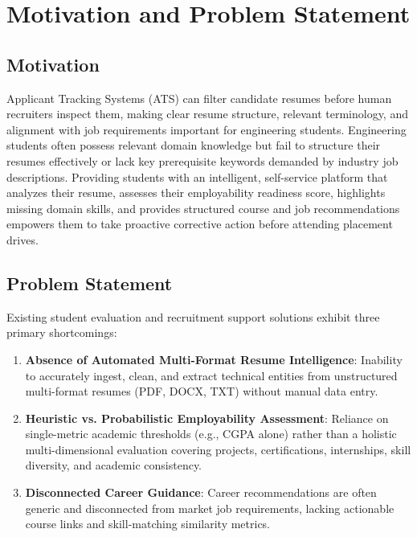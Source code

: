 \documentclass[12pt,a4paper]{report}
\begin{document}
\section{Motivation and Problem Statement}
\subsection{Motivation}
Applicant Tracking Systems (ATS) can filter candidate resumes before human recruiters inspect them, making clear resume structure, relevant terminology, and alignment with job requirements important for engineering students. Engineering students often possess relevant domain knowledge but fail to structure their resumes effectively or lack key prerequisite keywords demanded by industry job descriptions. Providing students with an intelligent, self-service platform that analyzes their resume, assesses their employability readiness score, highlights missing domain skills, and provides structured course and job recommendations empowers them to take proactive corrective action before attending placement drives.

\subsection{Problem Statement}
Existing student evaluation and recruitment support solutions exhibit three primary shortcomings:
\begin{enumerate}
    \item \textbf{Absence of Automated Multi-Format Resume Intelligence}: Inability to accurately ingest, clean, and extract technical entities from unstructured multi-format resumes (PDF, DOCX, TXT) without manual data entry.
    \item \textbf{Heuristic vs. Probabilistic Employability Assessment}: Reliance on single-metric academic thresholds (e.g., CGPA alone) rather than a holistic multi-dimensional evaluation covering projects, certifications, internships, skill diversity, and academic consistency.
    \item \textbf{Disconnected Career Guidance}: Career recommendations are often generic and disconnected from market job requirements, lacking actionable course links and skill-matching similarity metrics.
\end{enumerate}
\end{document}
